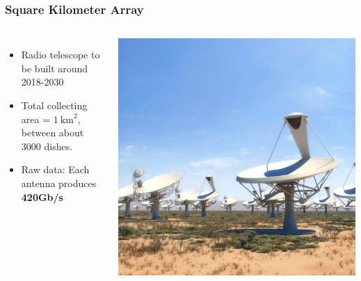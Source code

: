 \documentclass[10pt, compress]{beamer}
\begin{document}
\begin{frame}[fragile]
    \frametitle{Square Kilometer Array}
    \begin{columns}
            \begin{itemize}
                \item Radio telescope to be built around 2018-2030
                \item Total collecting area = $1~\mathrm{km}^2$, between about 3000 dishes.
                \item Raw data: Each antenna produces \textbf{420Gb/s}
            \end{itemize}
            \vspace{.01cm}
            \includegraphics[height=\textheight]{assets/ska_dish_mid_africa_closeup.jpg}
    \end{columns}
\end{frame}
\end{document}
